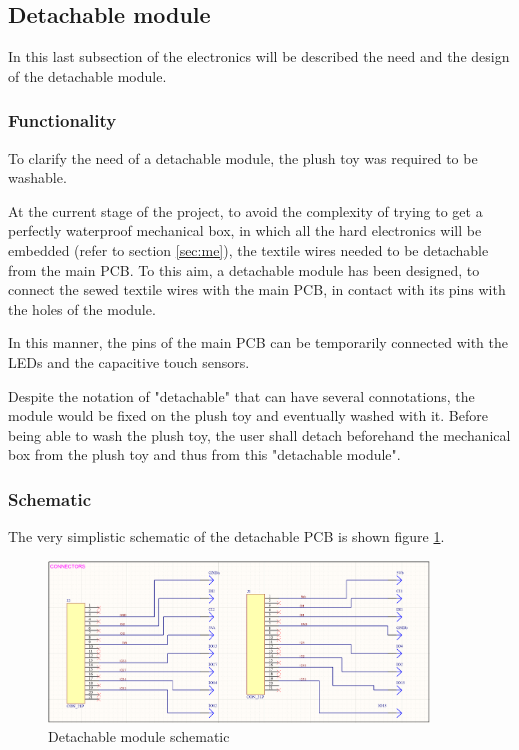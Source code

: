 \newpage
\subsection{Detachable module}
\label{subsec:detachable_module} 

In this last subsection of the electronics will be described the need and the design of the detachable module.

\subsubsection{Functionality}
\label{subsubsec:detachable_module/functionality} 

To clarify the need of a detachable module, the plush toy was required to be washable. 

\medskip At the current stage of the project, to avoid the complexity of trying to get a perfectly waterproof mechanical box, in which all the hard electronics will be embedded (refer to section \ref{sec:me}), the textile wires needed to be detachable from the main PCB. To this aim, a detachable module has been designed, to connect the sewed textile wires with the main PCB, in contact with its pins with the holes of the module. 

\medskip In this manner, the pins of the main PCB can be temporarily connected with the LEDs and the capacitive touch sensors. 

\medskip Despite the notation of "detachable" that can have several connotations, the module would be fixed on the plush toy and eventually washed with it. Before being able to wash the plush toy, the user shall detach beforehand the mechanical box from the plush toy and thus from this "detachable module".

\subsubsection{Schematic}
\label{subsubsec:detachable_module/schematic} 

The very simplistic schematic of the detachable PCB is shown figure \ref{fig:detachable_module_schematic}.

\begin{figure}[H]
    \centering
    \includegraphics[width=0.9\textwidth]{images/EE_DetachableModuleSchematic.PNG}
    \caption{Detachable module schematic}
    \label{fig:detachable_module_schematic}
\end{figure}


